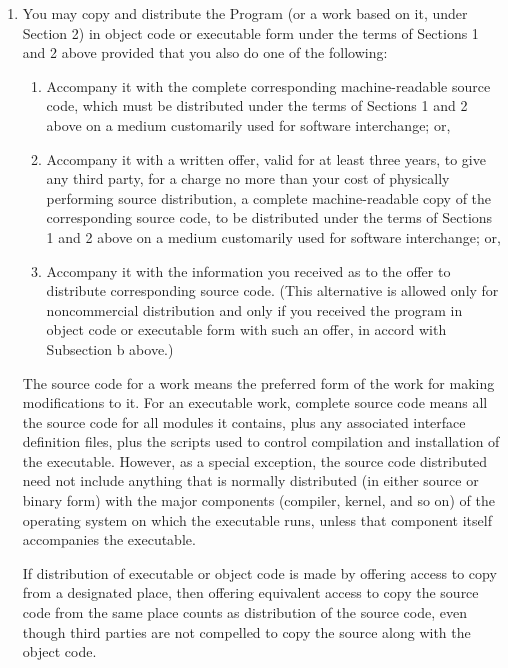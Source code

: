 \documentclass[a4paper,11pt,oneside]{book}
\begin{document}
\begin{enumerate}
	\item
	You may copy and distribute the Program (or a work based on it,
	under Section 2) in object code or executable form under the terms of
	Sections 1 and 2 above provided that you also do one of the following:

	\begin{enumerate}

		\item

		Accompany it with the complete corresponding machine-readable
		source code, which must be distributed under the terms of Sections
		1 and 2 above on a medium customarily used for software interchange; or,

		\item

		Accompany it with a written offer, valid for at least three
		years, to give any third party, for a charge no more than your
		cost of physically performing source distribution, a complete
		machine-readable copy of the corresponding source code, to be
		distributed under the terms of Sections 1 and 2 above on a medium
		customarily used for software interchange; or,

		\item

		Accompany it with the information you received as to the offer
		to distribute corresponding source code.  (This alternative is
		allowed only for noncommercial distribution and only if you
		received the program in object code or executable form with such
		an offer, in accord with Subsection b above.)

	\end{enumerate}


	The source code for a work means the preferred form of the work for
	making modifications to it.  For an executable work, complete source
	code means all the source code for all modules it contains, plus any
	associated interface definition files, plus the scripts used to
	control compilation and installation of the executable.  However, as a
	special exception, the source code distributed need not include
	anything that is normally distributed (in either source or binary
	form) with the major components (compiler, kernel, and so on) of the
	operating system on which the executable runs, unless that component
	itself accompanies the executable.

	If distribution of executable or object code is made by offering
	access to copy from a designated place, then offering equivalent
	access to copy the source code from the same place counts as
	distribution of the source code, even though third parties are not
	compelled to copy the source along with the object code.


\end{enumerate}
\end{document}
